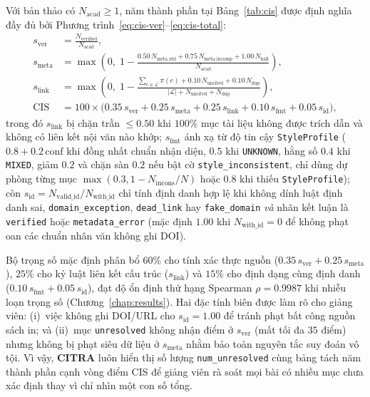 Với bản thảo có $N_{\text{acad}} \ge 1$, năm thành phần tại Bảng~\ref{tab:cis} được định nghĩa đầy đủ bởi Phương trình~\eqref{eq:cis-ver}--\eqref{eq:cis-total}:
\begin{align}
s_{\text{ver}} &= \frac{N_{\text{verified}}}{N_{\text{acad}}}, \label{eq:cis-ver}\\
s_{\text{meta}} &= \max\!\left(0,\; 1 - \frac{0.50\,N_{\text{meta\_std}} + 0.75\,N_{\text{meta\_incomp}} + 1.00\,N_{\text{hall}}}{N_{\text{acad}}}\right), \label{eq:cis-meta}\\
s_{\text{link}} &= \max\!\left(0,\; 1 - \frac{\sum_{e \in \mathcal{L}} \pi(e) + 0.10\,N_{\text{uncited}} + 0.10\,N_{\text{dup}}}{|\mathcal{L}| + N_{\text{uncited}} + N_{\text{dup}}}\right), \label{eq:cis-link}\\
\text{CIS} &= 100 \times \bigl(0.35\,s_{\text{ver}} + 0.25\,s_{\text{meta}} + 0.25\,s_{\text{link}} + 0.10\,s_{\text{fmt}} + 0.05\,s_{\text{id}}\bigr), \label{eq:cis-total}
\end{align}
trong đó $s_{\text{link}}$ bị chặn trần $\le 0.50$ khi $100\%$ mục tài liệu không được trích dẫn và không có liên kết nội văn nào khớp; $s_{\text{fmt}}$ ánh xạ từ độ tin cậy \texttt{StyleProfile} ($0.8 + 0.2\,\text{conf}$ khi đồng nhất chuẩn nhận diện, $0.5$ khi \texttt{UNKNOWN}, hằng số $0.4$ khi \texttt{MIXED}, giảm $0.2$ và chặn sàn $0.2$ nếu bật cờ \texttt{style\_inconsistent}, chỉ dùng dự phòng từng mục $\max(0.3, 1 - N_{\text{incons}} / N)$ hoặc $0.8$ khi thiếu \texttt{StyleProfile}); còn $s_{\text{id}} = N_{\text{valid\_id}} / N_{\text{with\_id}}$ chỉ tính định danh hợp lệ khi không dính luật định danh sai, \texttt{domain\_exception}, \texttt{dead\_link} hay \texttt{fake\_domain} \emph{và} nhãn kết luận là \texttt{verified} hoặc \texttt{metadata\_error} (mặc định $1.00$ khi $N_{\text{with\_id}} = 0$ để không phạt oan các chuẩn nhân văn không ghi DOI).

Bộ trọng số mặc định phân bổ $60\%$ cho tính xác thực nguồn ($0.35\,s_{\text{ver}} + 0.25\,s_{\text{meta}}$), $25\%$ cho kỷ luật liên kết cấu trúc ($s_{\text{link}}$) và $15\%$ cho định dạng cùng định danh ($0.10\,s_{\text{fmt}} + 0.05\,s_{\text{id}}$), đạt độ ổn định thứ hạng Spearman $\rho = 0.9987$ khi nhiễu loạn trọng số (Chương~\ref{chap:results}). Hai đặc tính biên được làm rõ cho giảng viên: (i)~việc không ghi DOI/URL cho $s_{\text{id}} = 1.00$ để tránh phạt bất công nguồn sách in; và (ii)~mục \texttt{unresolved} không nhận điểm ở $s_{\text{ver}}$ (mất tối đa $35$ điểm) nhưng không bị phạt siêu dữ liệu ở $s_{\text{meta}}$ nhằm bảo toàn nguyên tắc suy đoán vô tội. Vì vậy, \textbf{CITRA} luôn hiển thị số lượng \texttt{num\_unresolved} cùng bảng tách năm thành phần cạnh vòng điểm CIS để giảng viên rà soát mọi bài có nhiều mục chưa xác định thay vì chỉ nhìn một con số tổng.


